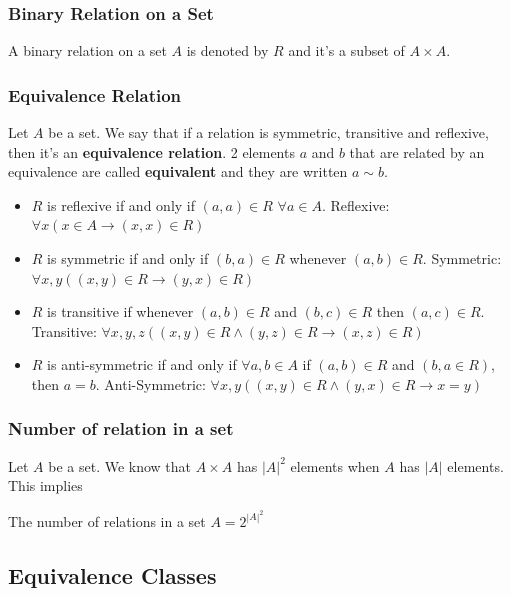 \documentclass{article}
\begin{document}
\subsubsection{Binary Relation on a Set} A binary relation on a set $ A $ is denoted by $ R $ and it's a subset of $ A \times A $.

\subsubsection{Equivalence Relation} Let $ A $ be a set. We say that if a relation is symmetric, transitive and reflexive, then it's an \textbf{equivalence relation}. 2 elements $ a $ and $ b $ that are related by an equivalence are called \textbf{equivalent} and they are written $ a \sim b $.
\begin{itemize}
\item $ R $ is reflexive if and only if $ (a,a) \in R $ $ \forall a \in A $. Reflexive: $ \forall x(x \in A \rightarrow (x,x) \in R) $
\item $ R $ is symmetric if and only if $ (b,a) \in R $ whenever $ (a,b) \in R $. Symmetric: $ \forall x,y((x,y) \in R \rightarrow (y,x) \in R) $
\item $ R $ is transitive if whenever $ (a,b) \in R $ and $ (b,c) \in R $ then $ (a,c) \in R $. Transitive: $ \forall x,y,z((x,y) \in R \wedge (y,z) \in R \rightarrow (x,z) \in R) $
\item $ R $ is anti-symmetric if and only if $ \forall a,b \in A $ if $ (a,b) \in R $ and $ (b,a \in R) $, then $ a = b $. Anti-Symmetric: $\forall x,y((x,y) \in R \wedge (y,x) \in R \rightarrow x = y) $
\end{itemize}

\subsubsection{Number of relation in a set} Let $ A $ be a set. We know that $ A \times A $ has $ |A|^2 $ elements when $ A $ has $ |A| $ elements. This implies

\begin{tcolorbox}[sharp corners, colback=green!30, colframe=green!80!blue, title=Number of relation in a set]
The number of relations in a set $ A = 2^{|A|^{2}} $
\end{tcolorbox}

\subsection{Equivalence Classes}
\end{document}
